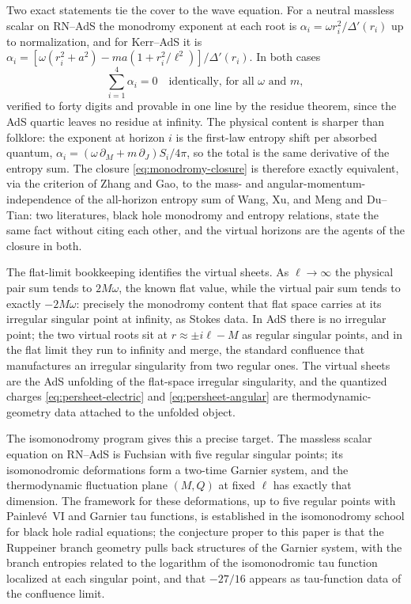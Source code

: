 Two exact statements tie the cover to the wave equation. For a neutral massless scalar on RN--AdS the monodromy exponent at each root is $\alpha_i = \omega r_i^2/\Delta'(r_i)$ up to normalization, and for Kerr--AdS it is $\alpha_i = [\omega(r_i^2 + a^2) - m a(1 + r_i^2/\ell^2)]/\Delta'(r_i)$. In both cases
\begin{equation}
\sum_{i=1}^{4} \alpha_i = 0 \quad\text{identically, for all } \omega \text{ and } m,
\label{eq:monodromy-closure}
\end{equation}
verified to forty digits and provable in one line by the residue theorem, since the AdS quartic leaves no residue at infinity. The physical content is sharper than folklore: the exponent at horizon $i$ is the first-law entropy shift per absorbed quantum, $\alpha_i = (\omega\,\partial_M + m\,\partial_J)S_i/4\pi$, so the total is the same derivative of the entropy sum. The closure \eqref{eq:monodromy-closure} is therefore exactly equivalent, via the criterion of Zhang and Gao, to the mass- and angular-momentum-independence of the all-horizon entropy sum of Wang, Xu, and Meng and Du--Tian: two literatures, black hole monodromy and entropy relations, state the same fact without citing each other, and the virtual horizons are the agents of the closure in both.

The flat-limit bookkeeping identifies the virtual sheets. As $\ell \to \infty$ the physical pair sum tends to $2M\omega$, the known flat value, while the virtual pair sum tends to exactly $-2M\omega$: precisely the monodromy content that flat space carries at its irregular singular point at infinity, as Stokes data. In AdS there is no irregular point; the two virtual roots sit at $r \approx \pm i\ell - M$ as regular singular points, and in the flat limit they run to infinity and merge, the standard confluence that manufactures an irregular singularity from two regular ones. The virtual sheets are the AdS unfolding of the flat-space irregular singularity, and the quantized charges \eqref{eq:persheet-electric} and \eqref{eq:persheet-angular} are thermodynamic-geometry data attached to the unfolded object.


The isomonodromy program gives this a precise target. The massless scalar equation on RN--AdS is Fuchsian with five regular singular points; its isomonodromic deformations form a two-time Garnier system, and the thermodynamic fluctuation plane $(M,Q)$ at fixed $\ell$ has exactly that dimension. The framework for these deformations, up to five regular points with Painlev\'e~VI and Garnier tau functions, is established in the isomonodromy school for black hole radial equations; the conjecture proper to this paper is that the Ruppeiner branch geometry pulls back structures of the Garnier system, with the branch entropies related to the logarithm of the isomonodromic tau function localized at each singular point, and that $-27/16$ appears as tau-function data of the confluence limit.

